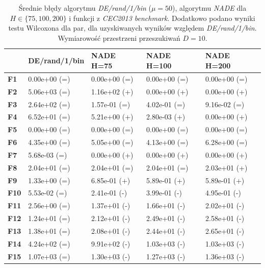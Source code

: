 \documentclass[12pt,a4paper]{report}
\begin{document}
{{{{{{\begin{table}[]
\centering
\caption{Średnie błędy algorytmu \emph{DE/rand/1/bin} ($\mu = 50$), algorytmu \emph{NADE} dla $H \in \{75, 100, 200\}$ i funkcji z \emph{CEC2013 benchmark}. Dodatkowo podano wyniki testu Wilcoxona dla par, dla uzyskiwanych wyników względem \emph{DE/rand/1/bin}. Wymiarowość przestrzeni przeszukiwań $D = 10$.}
\label{FullEksp110}
\begin{tabular}{|l|l|l|l|l|}
\hline
          & {\bf DE/rand/1/bin} & {\bf NADE H=75} & {\bf NADE H=100} & {\bf NADE H=200} \\ \hline
{\bf F1}  & 0.00e+00 (=)        & 0.00e+00 (=)    & 0.00e+00 (=)     & 0.00e+00 (=)     \\ \hline
{\bf F2}  & 5.06e+03 (=)        & 1.16e+02 (+)    & 0.00e+00 (+)     & 0.00e+00 (+)     \\ \hline
{\bf F3}  & 2.64e+02 (=)        & 1.57e-01 (=)    & 4.02e-01 (=)     & 9.16e-02 (=)     \\ \hline
{\bf F4}  & 6.52e+01 (=)        & 5.21e+00 (+)    & 2.80e-03 (+)     & 0.00e+00 (+)     \\ \hline
{\bf F5}  & 0.00e+00 (=)        & 0.00e+00 (=)    & 0.00e+00 (=)     & 0.00e+00 (=)     \\ \hline
{\bf F6}  & 4.35e+00 (=)        & 5.05e+00 (=)    & 4.13e+00 (=)     & 6.28e+00 (=)     \\ \hline
{\bf F7}  & 5.68e-03 (=)        & 0.00e+00 (+)    & 0.00e+00 (+)     & 0.00e+00 (+)     \\ \hline
{\bf F8}  & 2.04e+01 (=)        & 2.04e+01 (=)    & 2.04e+01 (=)     & 2.03e+01 (+)     \\ \hline
{\bf F9}  & 1.33e+00 (=)        & 6.85e-01 (+)    & 5.89e-01 (+)     & 5.89e-01 (+)     \\ \hline
{\bf F10} & 5.53e-02 (=)        & 2.41e-01 (-)    & 3.99e-01 (-)     & 4.95e-01 (-)     \\ \hline
{\bf F11} & 2.56e+00 (=)        & 1.37e+01 (-)    & 1.66e+01 (-)     & 2.02e+01 (-)     \\ \hline
{\bf F12} & 1.24e+01 (=)        & 2.12e+01 (-)    & 2.49e+01 (-)     & 2.58e+01 (-)     \\ \hline
{\bf F13} & 1.38e+01 (=)        & 2.08e+01 (-)    & 2.44e+01 (-)     & 2.65e+01 (-)     \\ \hline
{\bf F14} & 4.24e+02 (=)        & 9.91e+02 (-)    & 1.03e+03 (-)     & 1.03e+03 (-)     \\ \hline
{\bf F15} & 1.07e+03 (=)        & 1.30e+03 (-)    & 1.27e+03 (-)     & 1.36e+03 (-)     \\ \hline

\end{tabular}
\end{table}}}}}}}
\end{document}
